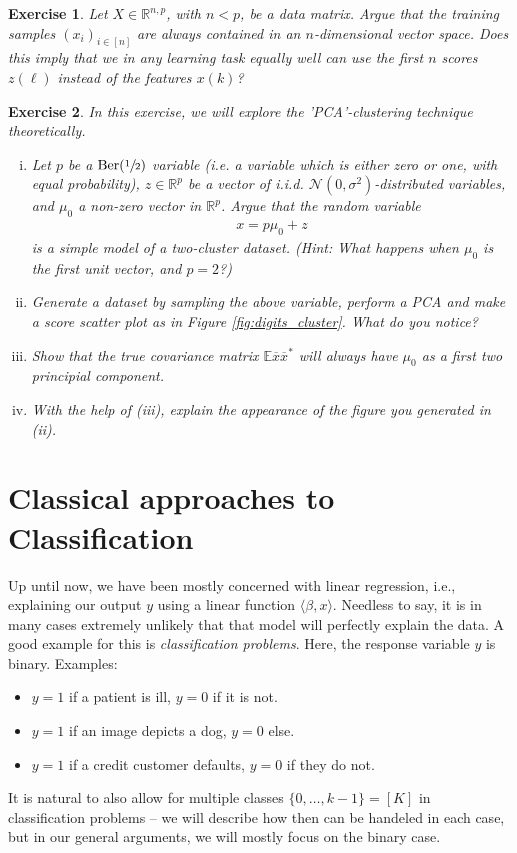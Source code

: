 \documentclass{article}
\newcommand{\erw}{\mathbb{E}} %
\newcommand{\sprod}[1]{\langle #1 \rangle}
\newcommand{\calN}{\mathcal{N}}
\newcommand{\R}{\mathbb{R}}
\newtheorem{exercise}{Exercise}
\begin{document}
\begin{exercise}
    Let $X\in \R^{n,p}$, with $n<p$, be a data matrix. Argue that the training samples $(x_i)_{i \in [n]}$ are always contained in an $n$-dimensional vector space. Does this imply that we in any learning task equally well can use the first $n$ scores $z(\ell)$ instead of the features $x(k)$?
\end{exercise}

\begin{exercise}
    In this exercise, we will explore the 'PCA'-clustering technique theoretically.

    \begin{enumerate}[(i)]
        \item Let $p$ be a $\mathrm{Ber}(\sfrac{1}{2})$ variable (i.e. a variable which is either zero or one, with equal probability), $z\in \R^p$ be a vector of i.i.d. $\calN(0,\sigma^2)$-distributed variables, and $\mu_0$ a non-zero vector in $\R^p$. Argue that the random variable
        \begin{align*}
            x = p\mu_0 + z
        \end{align*}
        is a simple model of a two-cluster dataset. (\emph{Hint}: What happens when $\mu_0$ is the first unit vector, and $p=2$?)
        \item Generate a dataset by sampling the above variable, perform a PCA and make a score scatter plot as in Figure \ref{fig:digits_cluster}. What do you notice?
        \item Show that the true covariance matrix $\erw{\overline{x}\overline{x}^*}$ will always have $\mu_0$ as a first two principial component. 
        \item With the help of (iii), explain the appearance of the figure you generated in (ii).
    \end{enumerate}
\end{exercise}


\section{Classical approaches to Classification}
Up until now, we have been mostly concerned with linear regression, i.e., explaining our output $y$ using a linear function $\sprod{\beta,x}$. Needless to say, it is in many cases extremely unlikely that that model will perfectly explain the data. A good example for this is \emph{classification problems}. Here, the response variable $y$ is binary. Examples:
\begin{itemize}
    \item $y=1$ if a patient is ill, $y=0$ if it is not.
    \item $y=1$ if an image depicts a dog, $y=0$ else.
    \item $y=1$ if a credit customer defaults, $y=0$ if they do not.
\end{itemize}
It is natural to also allow for multiple classes $\{0,\dots, k-1\}=[K]$ in classification problems -- we will describe how then can be handeled in each case, but in our general arguments, we will mostly focus on the binary case.
\end{document}
